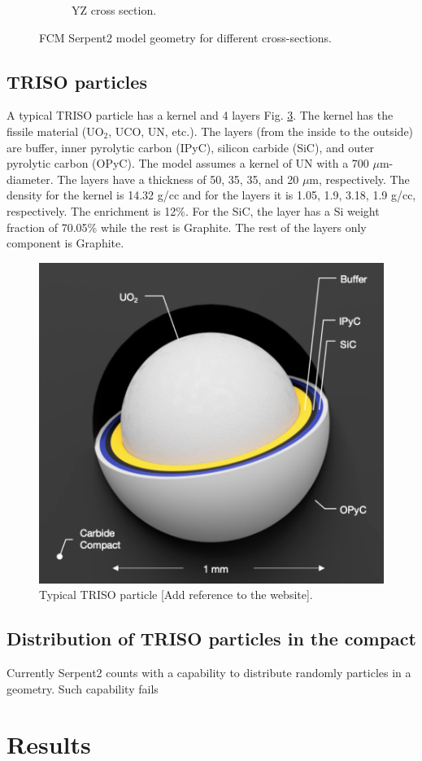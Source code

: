 \documentclass[11pt,letterpaper]{article}
\begin{document}
\begin{figure}[H]
\begin{subfigure}[t]{0.4\textwidth}
		\caption{YZ cross section.}
		\label{fig:FCM_yz}
	\end{subfigure}
	\hfill
	\caption{FCM Serpent2 model geometry for different cross-sections.}
	\label{fig:FCM}
\end{figure}

\subsection{TRISO particles}

A typical TRISO particle has a kernel and 4 layers Fig. \ref{fig:triso}. The kernel has the fissile material (UO$_2$, UCO, UN, etc.). The layers (from the inside to the outside) are buffer, inner pyrolytic carbon (IPyC), silicon carbide (SiC), and outer pyrolytic carbon (OPyC).
The model assumes a kernel of UN with a 700 $\mu$m-diameter. The layers have a thickness of 50, 35, 35, and 20 $\mu$m, respectively.
The density for the kernel is 14.32 g/cc and for the layers it is 1.05, 1.9, 3.18, 1.9 g/cc, respectively. The enrichment is 12\%. For the SiC, the layer has a Si weight fraction of 70.05\% while the rest is Graphite. The rest of the layers only component is Graphite.

\begin{figure}[H]
	\centering
	\includegraphics[width=0.5\linewidth]{figures/triso1.png}
	\hfill
	\caption{Typical TRISO particle [Add reference to the website].}
	\label{fig:triso}
\end{figure}

\subsection{Distribution of TRISO particles in the compact}

Currently Serpent2 counts with a capability to distribute randomly particles in a geometry. Such capability fails 

\section{Results}
\end{document}
